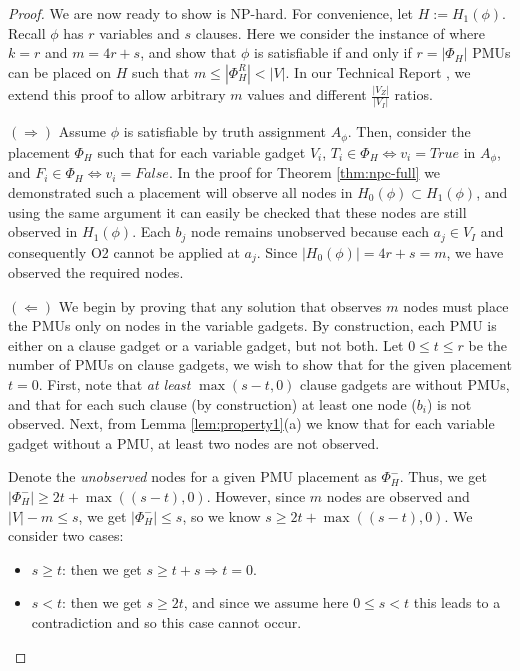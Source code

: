 \begin{proof}

We are now ready to show \maxinc is NP-hard. For convenience, let $H := H_1(\phi)$.  Recall $\phi$ has $r$ variables and $s$ clauses. 
Here we consider the instance of \maxinc where $k=r$ and $m = 4r + s$, and show that $\phi$ is satisfiable if and only if $r=|\Phi_H|$ PMUs
can be placed on $H$ such that $m \leq |\Phi^R_{H}| < |V|$. In our Technical Report \cite{Tech12}, 
we extend this proof to allow arbitrary $m$ values and different $\frac{|V_Z|}{|V_I|}$ ratios.

$(\Rightarrow)$ Assume $\phi$ is satisfiable by truth assignment $A_{\phi}$. Then, consider the placement $\Phi_H$ such that for each variable gadget $V_i$, $T_i\in \Phi_H \Leftrightarrow v_i=True$
in $A_\phi$, and  $F_i\in \Phi_H \Leftrightarrow v_i=False$.  In the proof for Theorem \ref{thm:npc-full} we demonstrated such a placement will observe all nodes in $H_0(\phi)\subset H_1(\phi)$, and using the same argument it can easily be checked that these nodes are still observed in $H_1(\phi)$. Each $b_j$ node remains unobserved because each $a_j \in V_I$ and consequently O2 cannot be applied at $a_j$.
Since $|H_0(\phi)|=4r+s = m$, we have observed the required nodes.

$(\Leftarrow)$
We begin by proving that any solution that observes $m$ nodes must place the PMUs only on nodes in the variable gadgets. By construction, each PMU is either on a clause gadget or a variable gadget, but not both. Let $0\leq t\leq r$ be the number of PMUs on clause gadgets, we wish to show that for the given placement $t=0$. First, note that {\em at least} $\max(s-t,0)$ clause gadgets are without PMUs, and that for each such clause (by construction) at least one node ($b_i$) is not observed. Next, from Lemma \ref{lem:property1}(a) we know that for each variable gadget without a PMU, at least two nodes are not observed.

Denote the {\em unobserved} nodes for a given PMU placement as $\Phi_H^-$. Thus, we get $|\Phi_H^-| \geq 2t + \max((s-t), 0)$. However, since $m$ nodes are observed and  $|V|-m \leq s$, we get $|\Phi_H^-| \leq s$, so we know $s \geq 2t + \max((s-t), 0)$. We consider two cases:
\begin{itemize}
	\item $s\geq t$: then we get $s \geq t + s \Rightarrow t=0.$
	\item $s < t$:	then we get $s \geq 2t$, and since we assume here $0\leq s < t$ this leads to a contradiction and so this case cannot occur.
\end{itemize}


\end{proof}
